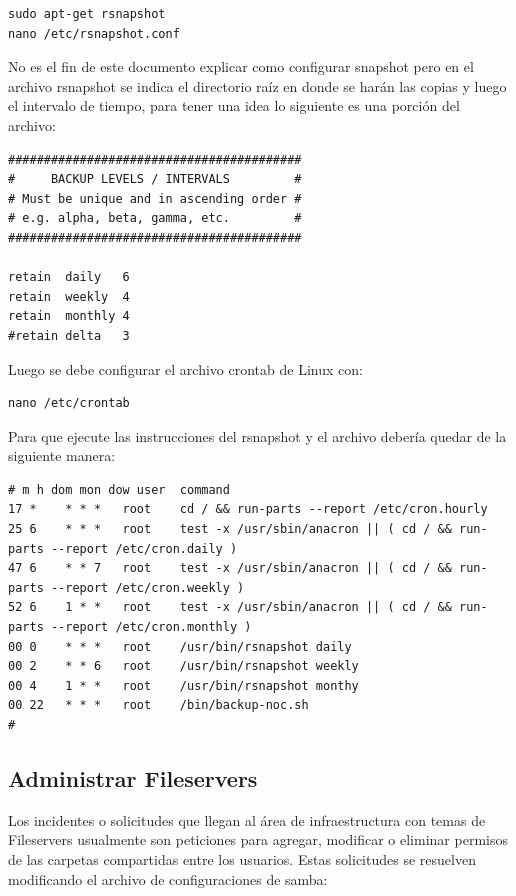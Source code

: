 \documentclass[12pt,a4paper]{article}
\begin{document}
\begin{lstlisting}
sudo apt-get rsnapshot
nano /etc/rsnapshot.conf
\end{lstlisting}

No es el fin de este documento explicar como configurar snapshot pero en el archivo rsnapshot se indica el directorio raíz en donde se harán las copias y luego el intervalo de tiempo, para tener una idea lo siguiente es una porción del archivo:

\begin{lstlisting}
#########################################
#     BACKUP LEVELS / INTERVALS         #
# Must be unique and in ascending order #
# e.g. alpha, beta, gamma, etc.         #
#########################################

retain	daily	6
retain	weekly	4
retain	monthly	4
#retain	delta	3
\end{lstlisting}

Luego se debe configurar el archivo crontab de Linux con:

\begin{lstlisting}
nano /etc/crontab 
\end{lstlisting}

Para que ejecute las instrucciones del rsnapshot y el archivo debería quedar de la siguiente manera:

\begin{lstlisting}
# m h dom mon dow user	command
17 *	* * *	root    cd / && run-parts --report /etc/cron.hourly
25 6	* * *	root	test -x /usr/sbin/anacron || ( cd / && run-parts --report /etc/cron.daily )
47 6	* * 7	root	test -x /usr/sbin/anacron || ( cd / && run-parts --report /etc/cron.weekly )
52 6	1 * *	root	test -x /usr/sbin/anacron || ( cd / && run-parts --report /etc/cron.monthly )
00 0	* * *	root	/usr/bin/rsnapshot daily
00 2	* * 6	root	/usr/bin/rsnapshot weekly
00 4	1 * *	root	/usr/bin/rsnapshot monthy
00 22	* * *	root	/bin/backup-noc.sh
#
\end{lstlisting}

\subsection{Administrar Fileservers} %
Los incidentes o solicitudes que llegan al área de infraestructura con temas de Fileservers usualmente son peticiones para agregar, modificar o eliminar permisos de las carpetas compartidas entre los usuarios. Estas solicitudes se resuelven modificando el archivo de configuraciones de samba:
\end{document}

